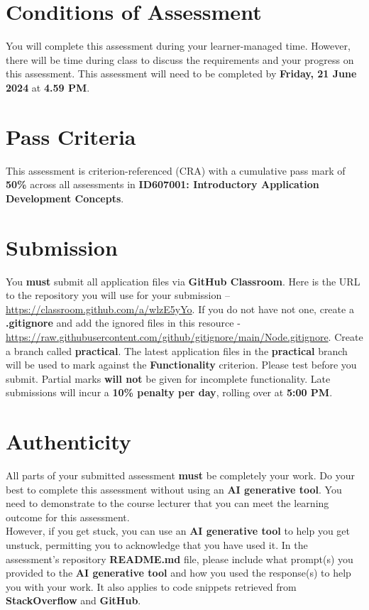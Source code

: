 \documentclass{article}
\begin{document}
\section*{Conditions of Assessment}
You will complete this assessment during your learner-managed time. However, there will be time during class to discuss the requirements and your progress on this assessment. This assessment will need to be completed by \textbf{Friday, 21 June 2024} at \textbf{4.59 PM}. 

\section*{Pass Criteria}
This assessment is criterion-referenced (CRA) with a cumulative pass mark of \textbf{50\%} across all assessments in \textbf{ID607001: Introductory Application Development Concepts}.

\section*{Submission}
You \textbf{must} submit all application files via \textbf{GitHub Classroom}. Here is the URL to the repository you will use for your submission – \href{https://classroom.github.com/a/wlzE5yYo}{https://classroom.github.com/a/wlzE5yYo}. If you do not have not one, create a \textbf{.gitignore} and add the ignored files in this resource - \href{https://raw.githubusercontent.com/github/gitignore/main/Node.gitignore}{https://raw.githubusercontent.com/github/gitignore/main/Node.gitignore}. Create a branch called \textbf{practical}. The latest application files in the \textbf{practical} branch will be used to mark against the \textbf{Functionality} criterion. Please test before you submit. Partial marks \textbf{will not} be given for incomplete functionality. Late submissions will incur a \textbf{10\% penalty per day}, rolling over at \textbf{5:00 PM}.

\section*{Authenticity}
All parts of your submitted assessment \textbf{must} be completely your work. Do your best to complete this assessment without using an \textbf{AI generative tool}. You need to demonstrate to the course lecturer that you can meet the learning outcome for this assessment. \\
 
 However, if you get stuck, you can use an \textbf{AI generative tool} to help you get unstuck, permitting you to acknowledge that you have used it. In the assessment's repository \textbf{README.md} file, please include what prompt(s) you provided to the \textbf{AI generative tool} and how you used the response(s) to help you with your work. It also applies to code snippets retrieved from \textbf{StackOverflow} and \textbf{GitHub}. \\
 
\end{document}
